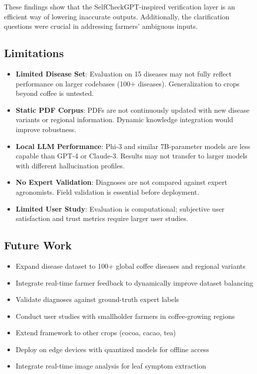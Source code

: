 \documentclass[conference]{IEEEtran}
\begin{document}
These findings show that the SelfCheckGPT-inspired verification layer is an efficient way of lowering inaccurate outputs. Additionally, the clarification questions were crucial in addressing farmers' ambiguous inputs.

\subsection{Limitations}

\begin{itemize}
    \item \textbf{Limited Disease Set}: Evaluation on 15 diseases may not fully reflect performance on larger codebases (100+ diseases). Generalization to crops beyond coffee is untested.

    \item \textbf{Static PDF Corpus}: PDFs are not continuously updated with new disease variants or regional information. Dynamic knowledge integration would improve robustness.

    \item \textbf{Local LLM Performance}: Phi-3 and similar 7B-parameter models are less capable than GPT-4 or Claude-3. Results may not transfer to larger models with different hallucination profiles.

    \item \textbf{No Expert Validation}: Diagnoses are not compared against expert agronomists. Field validation is essential before deployment.

    \item \textbf{Limited User Study}: Evaluation is computational; subjective user satisfaction and trust metrics require larger user studies.
\end{itemize}

\subsection{Future Work}

\begin{itemize}
    \item Expand disease dataset to 100+ global coffee diseases and regional variants
    \item Integrate real-time farmer feedback to dynamically improve dataset balancing
    \item Validate diagnoses against ground-truth expert labels
    \item Conduct user studies with smallholder farmers in coffee-growing regions
    \item Extend framework to other crops (cocoa, cacao, tea)
    \item Deploy on edge devices with quantized models for offline access
    \item Integrate real-time image analysis for leaf symptom extraction
\end{itemize}
\end{document}
